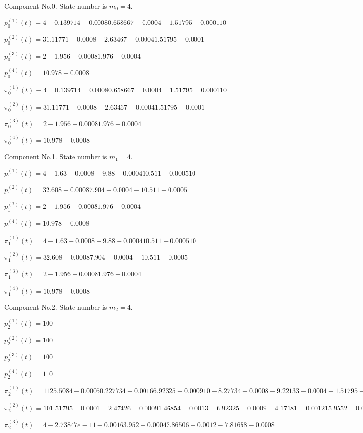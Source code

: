 

 Component No.0. State number is $m_0=4$.

 $p^{(1)}_0(t)=4 -0.139714 -0.0008 0.658667 -0.0004 -1.51795 -0.0001 1 0
$

 $p^{(2)}_0(t)=3 1.11771 -0.0008 -2.63467 -0.0004 1.51795 -0.0001
$

 $p^{(3)}_0(t)=2 -1.956 -0.0008 1.976 -0.0004
$

 $p^{(4)}_0(t)=1 0.978 -0.0008
$

 $\pi^{(1)}_0(t)=4 -0.139714 -0.0008 0.658667 -0.0004 -1.51795 -0.0001 1 0
$

 $\pi^{(2)}_0(t)=3 1.11771 -0.0008 -2.63467 -0.0004 1.51795 -0.0001
$

 $\pi^{(3)}_0(t)=2 -1.956 -0.0008 1.976 -0.0004
$

 $\pi^{(4)}_0(t)=1 0.978 -0.0008
$

 Component No.1. State number is $m_1=4$.

 $p^{(1)}_1(t)=4 -1.63 -0.0008 -9.88 -0.0004 10.511 -0.0005 1 0
$

 $p^{(2)}_1(t)=3 2.608 -0.0008 7.904 -0.0004 -10.511 -0.0005
$

 $p^{(3)}_1(t)=2 -1.956 -0.0008 1.976 -0.0004
$

 $p^{(4)}_1(t)=1 0.978 -0.0008
$

 $\pi^{(1)}_1(t)=4 -1.63 -0.0008 -9.88 -0.0004 10.511 -0.0005 1 0
$

 $\pi^{(2)}_1(t)=3 2.608 -0.0008 7.904 -0.0004 -10.511 -0.0005
$

 $\pi^{(3)}_1(t)=2 -1.956 -0.0008 1.976 -0.0004
$

 $\pi^{(4)}_1(t)=1 0.978 -0.0008
$

 Component No.2. State number is $m_2=4$.

 $p^{(1)}_2(t)=1 0 0
$

 $p^{(2)}_2(t)=1 0 0
$

 $p^{(3)}_2(t)=1 0 0
$

 $p^{(4)}_2(t)=1 1 0
$

 $\pi^{(1)}_2(t)=11 25.5084 -0.0005 0.227734 -0.0016 6.92325 -0.0009 1 0 -8.27734 -0.0008 -9.22133 -0.0004 -1.51795 -0.0001 -15.9552 -0.0006 -1.46854 -0.0013 0.30675 -0.0012 2.47426 -0.0009
$

 $\pi^{(2)}_2(t)=10 1.51795 -0.0001 -2.47426 -0.0009 1.46854 -0.0013 -6.92325 -0.0009 -4.17181 -0.0012 15.9552 -0.0006 14.1379 -0.0008 5.26933 -0.0004 -25.5084 -0.0005 0.72875 -0.0016
$

 $\pi^{(3)}_2(t)=4 -2.73847e-11 -0.0016 3.952 -0.0004 3.86506 -0.0012 -7.81658 -0.0008
$

